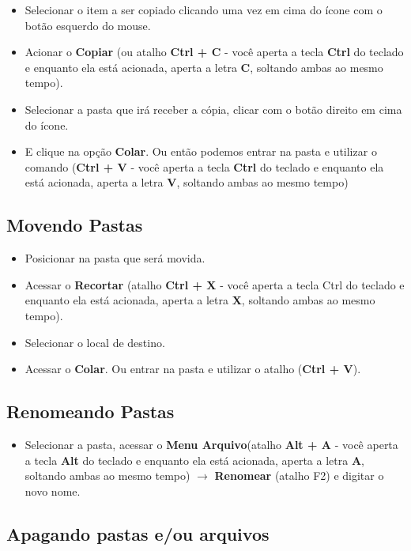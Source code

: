 \documentclass[hidelinks,12pt]{article}
\begin{document}
		\begin{itemize}

			\item Selecionar o item a ser copiado clicando uma vez em cima do ícone com o botão esquerdo do mouse.
			\item Acionar o {\bf Copiar} (ou atalho {\bf Ctrl + C} - você aperta a tecla \textbf{Ctrl} do teclado e enquanto ela está acionada, aperta a letra {\bf C}, soltando ambas ao mesmo tempo).
			\item Selecionar a pasta que irá receber a cópia, clicar com o botão direito em cima do ícone.
			\item E clique na opção {\bf Colar}. Ou então podemos entrar na pasta e utilizar o comando ({\bf Ctrl + V} - você aperta a tecla {\bf Ctrl} do teclado e enquanto ela está acionada, aperta a letra {\bf V}, soltando ambas ao mesmo tempo)
		\end{itemize}

		\subsection{Movendo Pastas}

		\begin{itemize}
			\item Posicionar na pasta que será movida.
			\item Acessar o {\bf Recortar} (atalho {\bf Ctrl + X} - você aperta a tecla Ctrl do teclado e enquanto ela está acionada, aperta a letra {\bf X}, soltando ambas ao mesmo tempo).
			\item Selecionar o local de destino.
			\item Acessar o {\bf Colar}. Ou entrar na pasta e utilizar o atalho ({\bf Ctrl + V}).
		\end{itemize}

		\subsection{Renomeando Pastas}

		\begin{itemize}
			\item Selecionar a pasta, acessar o {\bf Menu Arquivo}(atalho {\bf Alt + A} - você aperta a tecla {\bf Alt} do teclado e enquanto ela está acionada, aperta a letra {\bf A}, soltando ambas ao mesmo tempo) $\rightarrow$ {\bf Renomear} (atalho F2) e digitar o novo nome.
		\end{itemize}

		\subsection{Apagando pastas e/ou arquivos}
\end{document}
